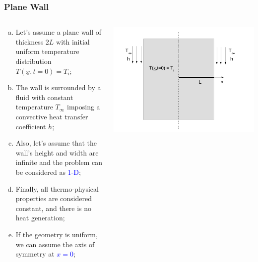 \documentclass[10pt,compress,unknownkeysallowed]{beamer}
\newcommand{\blue}{\textcolor{blue}}
\begin{document}
\begin{frame}
 \frametitle{Plane Wall}
  \begin{columns}
    \begin{column}[l]{0.6\linewidth}
     \begin{enumerate}[(a)]%
        \item<1-> Let's assume a plane wall of thickness $2L$ with initial uniform temperature distribution $T\left(\underline{x},t=0\right)=T_{i}$;
        \item<1-> The wall is surrounded by a fluid with constant temperature $T_{\infty}$ imposing a convective heat transfer coefficient $h$;
        \item<1-> Also, let's assume that the wall's height and width are infinite and the problem can be considered as \blue{1-D};
        \item<1-> Finally, all thermo-physical properties are considered constant, and there is no heat generation;  
        \item<1-> If the geometry is uniform, we can assume the axis of symmetry at \blue{$x=0$};
     \end{enumerate}
    \end{column}
     \begin{column}[l]{0.4\linewidth}
        \begin{center}
          \includegraphics[width=1.1\columnwidth,height=1.3\columnwidth,clip]{./Pics/HT_PlaneWall}
        \end{center}
    \end{column}
  \end{columns}
\end{frame}
\end{document}
